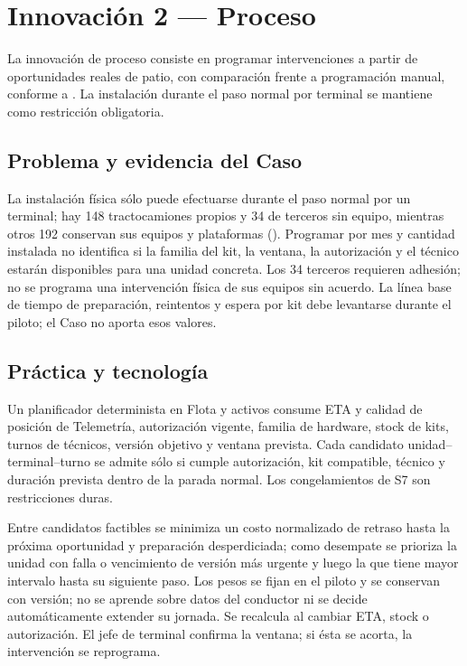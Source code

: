 \section{Innovación 2 — Proceso}\label{sec:13-innovacion-2}\label{sec:13-proceso}

La innovación de proceso consiste en programar intervenciones a partir de oportunidades reales de patio, con comparación frente a programación manual, conforme a . La instalación durante el paso normal por terminal se mantiene como restricción obligatoria.

\subsection{Problema y evidencia del Caso}\label{sec:13-proceso-problema-y-evidencia-del-caso}

La instalación física sólo puede efectuarse durante el paso normal por un terminal; hay 148 tractocamiones propios y 34 de terceros sin equipo, mientras otros 192 conservan sus equipos y plataformas (). Programar por mes y cantidad instalada no identifica si la familia del kit, la ventana, la autorización y el técnico estarán disponibles para una unidad concreta. Los 34 terceros requieren adhesión; no se programa una intervención física de sus equipos sin acuerdo. La línea base de tiempo de preparación, reintentos y espera por kit debe levantarse durante el piloto; el Caso no aporta esos valores.

\subsection{Práctica y tecnología}\label{sec:13-proceso-practica-y-tecnologia}

Un planificador determinista en Flota y activos consume ETA y calidad de posición de Telemetría, autorización vigente, familia de hardware, stock de kits, turnos de técnicos, versión objetivo y ventana prevista. Cada candidato unidad–terminal–turno se admite sólo si cumple autorización, kit compatible, técnico y duración prevista dentro de la parada normal. Los congelamientos de S7 son restricciones duras.

Entre candidatos factibles se minimiza un costo normalizado de retraso hasta la próxima oportunidad y preparación desperdiciada; como desempate se prioriza la unidad con falla o vencimiento de versión más urgente y luego la que tiene mayor intervalo hasta su siguiente paso. Los pesos se fijan en el piloto y se conservan con versión; no se aprende sobre datos del conductor ni se decide automáticamente extender su jornada. Se recalcula al cambiar ETA, stock o autorización. El jefe de terminal confirma la ventana; si ésta se acorta, la intervención se reprograma.

